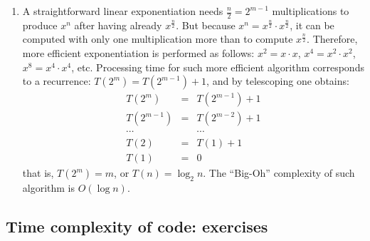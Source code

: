 \documentclass[]{article}
\begin{document}
\begin{enumerate}
\item 
A straightforward linear exponentiation needs $\frac{n}{2}=2^{m-1}$ 
multiplications to produce $x^{n}$ after having 
already $x^{\frac{n}{2}}$. But because
$x^{n} = x^{\frac{n}{2}} \cdot x^{\frac{n}{2}}$, it can be
computed with only one multiplication more
than to compute $x^{\frac{n}{2}}$. Therefore,
more efficient exponentiation is performed as
follows: $x^{2}=x \cdot x$, $x^{4}=x^{2} \cdot x^{2}$, 
$x^{8}=x^{4} \cdot x^{4}$, etc. Processing time for
such more efficient algorithm corresponds to a recurrence:
$T(2^{m}) = T(2^{m-1}) + 1$, and by telescoping
one obtains:
\[
\begin{array}{lll}
T(2^{m}) & = & T(2^{m-1}) + 1\\
T(2^{m-1}) & = & T(2^{m-2}) + 1\\
\cdots & & \cdots \\
T(2) & = & T(1) + 1\\
T(1) & = & 0
\end{array}
\]  
that is, $T(2^{m}) = m$, or $T(n)=\log_{2}n$. The ``Big-Oh''
complexity of such algorithm is $O(\log n)$.

\end{enumerate}

\subsection{Time complexity of code: exercises}
\end{document}
